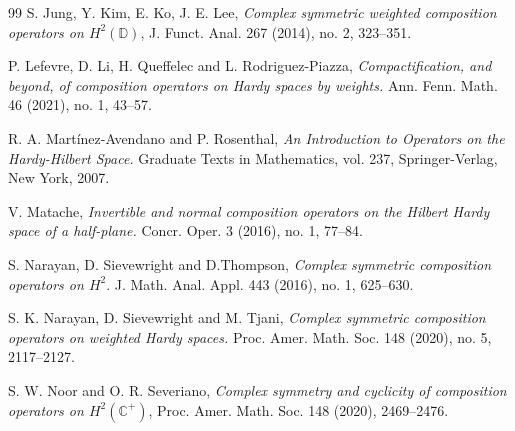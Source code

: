 \documentclass[11pt]{amsart}%
\theoremstyle{definition}
\theoremstyle{remark}
\numberwithin{equation}{section}
\begin{document}
\begin{thebibliography}{99}
S. Jung, Y. Kim, E. Ko, J. E. Lee, \emph{Complex symmetric
weighted composition operators on $H^{2}(\mathbb{D})$}, J. Funct. Anal. 267
(2014), no. 2, 323--351.



P. Lefevre, D. Li, H. Queffelec and L. Rodriguez-Piazza, \emph{
Compactification, and beyond, of composition operators on Hardy spaces by
weights.} Ann. Fenn. Math. 46 (2021), no. 1, 43--57.

R. A. Mart\'inez-Avendano and P. Rosenthal,
\emph{ An Introduction to Operators on the Hardy-Hilbert Space.} Graduate
Texts in Mathematics, vol. 237, Springer-Verlag, New York, 2007.



V. Matache, \emph{Invertible and normal
composition operators on the Hilbert Hardy space of a half-plane.} Concr.
Oper. 3 (2016), no. 1, 77--84.

S. Narayan, D. Sievewright and D.Thompson, \emph{Complex
symmetric composition operators on $H^{2}.$} J. Math. Anal. Appl. 443 (2016),
no. 1, 625--630.

S. K. Narayan, D. Sievewright and M. Tjani, \emph{Complex
symmetric composition operators on weighted Hardy spaces.} Proc. Amer. Math.
Soc. 148 (2020), no. 5, 2117--2127.

S. W. Noor and O. R. Severiano, \emph{Complex symmetry and
cyclicity of composition operators on $H^{2}(\mathbb{C}^{+})$}, Proc. Amer.
Math. Soc. 148 (2020), 2469--2476.








\end{thebibliography}
\end{document}
